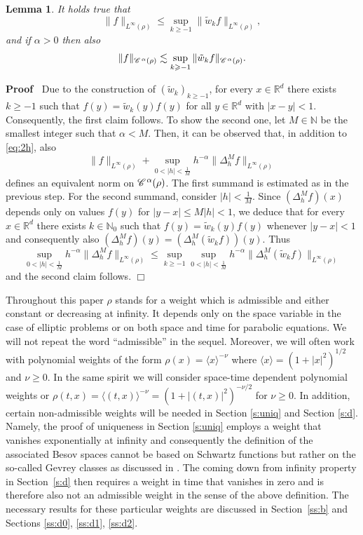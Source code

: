 \documentclass[a4paper,11pt]{article}
\renewcommand{\geq}{\geqslant}
\newenvironment{proof}{\noindent\textbf{Proof\ }}{\hspace*{\fill}$\Box$\medskip}
\newtheorem{lemma}[theorem]{Lemma}
\numberwithin{equation}{section}
\newcommand{\CC}{\mathscr{C} \hspace{.1em}}
\newcommand{\R}{\mathbb{R}}
\newcommand{\N}{\mathbb{N}}
\newcommand{\8}{\infty}
\begin{document}
\begin{lemma}\label{lem:2.1}
It holds true that
\[ \| f \|_{L^{\infty} (\rho)} \leqslant \sup_{k\geq-1} \| \tilde{w}_k f
   \|_{L^{\infty} (\rho)}, \]
and if $\alpha>0$ then also
   $$
   \| f \|_{\CC^{\alpha} (\rho)} \lesssim\sup_{k\geq-1} \| \tilde{w}_k f
   \|_{\CC^{\alpha} (\rho)}.
   $$
\end{lemma}

\begin{proof}
Due to the construction of $(\tilde w_k)_{k\geq -1}$, for every $x\in\R^d$ there exists $k\geq -1$ such that $f(y)=\tilde{w}_k(y)f(y)$ for all $y\in \R^d$ with $|x-y|<1$. Consequently, the first claim follows. To show the second one, let $M\in\N$ be the smallest integer such that $\alpha<M$.
Then, it can be observed that, in addition to \eqref{eq:2h}, also 
$$
\| f \|_{L^{\infty} (\rho)} +\sup_{0<|h|< \frac{1}{M}}h^{-\alpha}\|\Delta^M_h f\|_{L^\infty(\rho)}
$$
defines an equivalent norm on $\CC^\alpha(\rho)$. The first summand is estimated as in the previous step. For the second summand, consider $|h|<\frac{1}{M}$. Since $(\Delta^M_hf)(x)$ depends only on  values  $f(y)$ for  $|y-x|\leqslant M|h|<1$, we deduce that for every $x\in \R^d$ there exists $k\in\N_0$ such that $f(y)=\tilde w_k(y)f(y)$ whenever $|y-x|<1$ and consequently also $(\Delta^M_hf)(y)=(\Delta^M_h(\tilde w_kf))(y)$. Thus
$$
\sup_{0<|h|< \frac{1}{M}}h^{-\alpha}\|\Delta^M_h f\|_{L^\infty(\rho)}\leqslant \sup_{k\geq-1}\sup_{0<|h|< \frac{1}{M}}h^{-\alpha}\|\Delta^M_h (\tilde w_kf)\|_{L^\infty(\rho)}
$$
and the second claim follows.
\end{proof}




Throughout this paper $\rho$ stands for a weight which is admissible and either constant or decreasing at infinity. It depends only on the space variable in the case of elliptic problems  or on both space and time for parabolic equations. We will not repeat the word ``admissible'' in the sequel. Moreover,  we will often work with  polynomial weights of the form $\rho(x)=\langle x\rangle^{-\nu}$ where  $\langle x\rangle=(1+|x|^{2})^{1/2}$ and $\nu\geq 0$. In the same spirit we will consider space-time dependent polynomial weights or $\rho(t,x)=\langle (t,x)\rangle^{-\nu}=(1+|(t,x)|^{2})^{-\nu/2}$ for $\nu\geq 0$. In addition, certain non-admissible weights will be needed in Section \ref{s:uniq} and Section \ref{s:d}. Namely, the proof of uniqueness in Section \ref{s:uniq} employs a weight that vanishes exponentially at infinity and consequently the definition of the associated Besov spaces cannot be based on Schwartz functions but rather on the so-called Gevrey classes as discussed in \cite{MW17}. The coming down from infinity property in Section~\ref{s:d} then requires a weight in time that vanishes in zero and is therefore also not an admissible weight in the sense of the above definition. The necessary results for these particular weights are discussed in Section~\ref{ss:b} and Sections \ref{ss:d0},  \ref{ss:d1}, \ref{ss:d2}.
\end{document}
